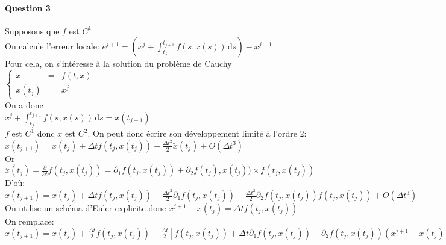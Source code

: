 \documentclass{article}
\begin{document}
\paragraph{Question 3} 

Supposons que $f$ est $C^{1}$ \\

On calcule l'erreur locale: $e^{j+1} = (x^{j}+ \int_{t_{j}}^{t_{j+1}} f(s,x(s)) \, \mathrm{d}s ) - x^{j+1}$ \\
Pour cela, on s'intéresse à la solution du problème de Cauchy 
$\left \{
\begin{array}{rcl}
\dot x&=&f(t,x) \\
x(t_{j})&=&x^{j}
\end{array}
\right.$ \\

On a donc \\$x^{j}+ \int_{t_{j}}^{t_{j+1}} f(s,x(s)) \, \mathrm{d}s = x(t_{j+1})$\\

$f$ est $C^{1}$ donc $x$ est $C^{2}$. On peut donc écrire son développement limité à l'ordre 2: \\

$x(t_{j+1}) = x(t_{j}) + \Delta t f(t_{j}, x(t_{j})) + \frac{\Delta t^{2}} {2} \ddot{x} (t_{j}) + O(\Delta t^{3})$ \\

Or $\ddot{x} (t_{j}) = \frac{ \partial }{ \partial t} f(t_{j}, x(t_{j})) = \partial _{1}f(t_{j},x(t_{j})) + \partial _{2} f(t_{j}), x(t_{j})) \times f(t_{j}, x(t_{j}))$\\

D'où: \\

$x(t_{j+1}) = x(t_{j}) + \Delta t f(t_{j}, x(t_{j})) + \frac{\Delta t^{2}} {2}  \partial _{1} f(t_{j}, x(t_{j})) + \frac{\Delta t^{2}} {2} \partial _{2} f(t_{j}, x(t_{j})) f(t_{j}, x(t_{j})) + O(\Delta t^{3})$ \\

On utilise un schéma d'Euler explicite donc $x^{j+1} - x(t_{j}) = \Delta t f(t_{j}, x(t_{j}))$\\
On remplace:\\

$x(t_{j+1}) = x(t_{j}) + \frac{\Delta t } {2} f(t_{j}, x(t_{j})) + \frac{\Delta t} {2} \left[  f(t_{j}, x(t_{j})) + \Delta t \partial _{1} f(t_{j}, x(t_{j})) + \partial _{2} f(t_{j}, x(t_{j})) (x^{j+1} - x(t_{j}))\right] + O(\Delta t^{3})$ \\
\end{document}
